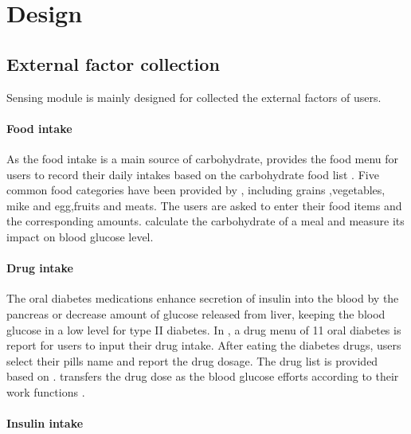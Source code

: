 
\section{Design}
\label{sec:design}

\subsection{External factor collection}
Sensing module is mainly designed for collected the external factors of users.

\paragraph{Food intake}
As the food intake is a main source of carbohydrate, \sysname provides the food menu for users to record their daily intakes based on the carbohydrate food list \cite{bib:carblist}.
Five common food categories have been provided by \sysname, including grains ,vegetables, mike and egg,fruits and meats. The users are asked to enter their food items and the corresponding amounts. \sysname calculate the carbohydrate of a meal and measure its impact on blood glucose level.

\paragraph{Drug intake}
The oral diabetes medications enhance secretion of insulin into the blood by the pancreas or decrease amount of glucose released from liver, keeping the blood glucose in a low level for type II diabetes.
In \sysname, a drug menu of 11 oral diabetes is report for users to input their drug intake. After eating the diabetes drugs, users select their pills name and report the drug dosage. The drug list is provided based on \cite{bib:druglist}.
\sysname transfers the drug dose as the blood glucose efforts according to their work functions \cite{bib:druglist, bib:bolen2007systematic, bib:bennett2011oral}.

\paragraph{Insulin intake}


